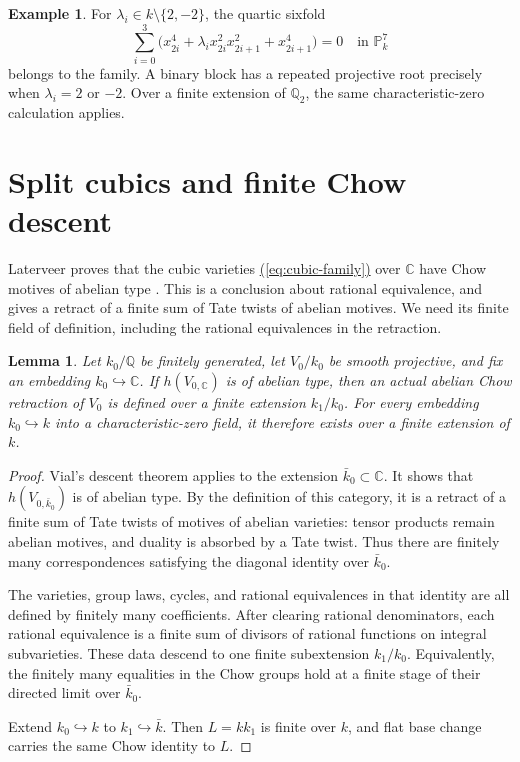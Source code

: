 \documentclass[11pt,a4paper]{article}
\newtheorem{lemma}[theorem]{Lemma}
\theoremstyle{definition}
\newtheorem{example}[theorem]{Example}
\theoremstyle{remark}\newtheorem{remark}[theorem]{Remark}
\numberwithin{equation}{section}
\newcommand{\Q}{\mathbb Q}\newcommand{\R}{\mathbb R}\newcommand{\C}{\mathbb C}
\newcommand{\PP}{\mathbb P}\newcommand{\LL}{\mathbb L}
\renewcommand{\eqref}[1]{\hyperref[#1]{\textcolor{equationlink}{(\ref*{#1})}}}
\begin{document}
\begin{example}
For $\lambda_i\in k\setminus\{2,-2\}$, the quartic sixfold
\[
 \sum_{i=0}^{3}
 \bigl(x_{2i}^4+\lambda_i x_{2i}^2x_{2i+1}^2+x_{2i+1}^4\bigr)=0
       \quad\text{in }\PP^7_k
\]
belongs to the family. A binary block has a repeated projective
root precisely when $\lambda_i=2$ or $-2$. Over a finite extension
of $\Q_2$, the same characteristic-zero calculation applies.
\end{example}

\section{Split cubics and finite Chow descent}\label{sec:cubic}

Laterveer proves that the cubic varieties
\eqref{eq:cubic-family} over $\C$ have Chow motives of abelian
type \cite[Theorem 5]{Laterveer}. This is a conclusion about
rational equivalence, and gives a retract of a finite sum of
Tate twists of abelian motives. We need its finite field of
definition, including the rational equivalences in the retraction.

\begin{lemma}\label{lem:descent}
Let $k_0/\Q$ be finitely generated, let $V_0/k_0$ be smooth
projective, and fix an embedding $k_0\hookrightarrow\C$.
If $h(V_{0,\C})$ is of abelian type, then an actual abelian
Chow retraction of $V_0$ is defined over a finite extension
$k_1/k_0$. For every embedding $k_0\hookrightarrow k$ into
a characteristic-zero field, it therefore exists over a finite
extension of $k$.
\end{lemma}

\begin{proof}
Vial's descent theorem \cite[Theorem 1 and \S1.1]{Vial} applies
to the extension $\bar k_0\subset\C$. It shows that
$h(V_{0,\bar k_0})$ is of abelian type. By the definition of
this category, it is a retract of a finite sum of Tate twists
of motives of abelian varieties: tensor products remain abelian
motives, and duality is absorbed by a Tate twist. Thus there
are finitely many correspondences satisfying the diagonal
identity over $\bar k_0$.

The varieties, group laws, cycles, and rational equivalences in
that identity are all defined by finitely many coefficients.
After clearing rational denominators, each rational equivalence
is a finite sum of divisors of rational functions on integral
subvarieties. These data descend to one finite subextension
$k_1/k_0$. Equivalently, the finitely many equalities in the
Chow groups hold at a finite stage of their directed limit over
$\bar k_0$.

Extend $k_0\hookrightarrow k$ to $k_1\hookrightarrow\bar k$.
Then $L=kk_1$ is finite over $k$, and flat base change carries
the same Chow identity to $L$.
\end{proof}
\end{document}
